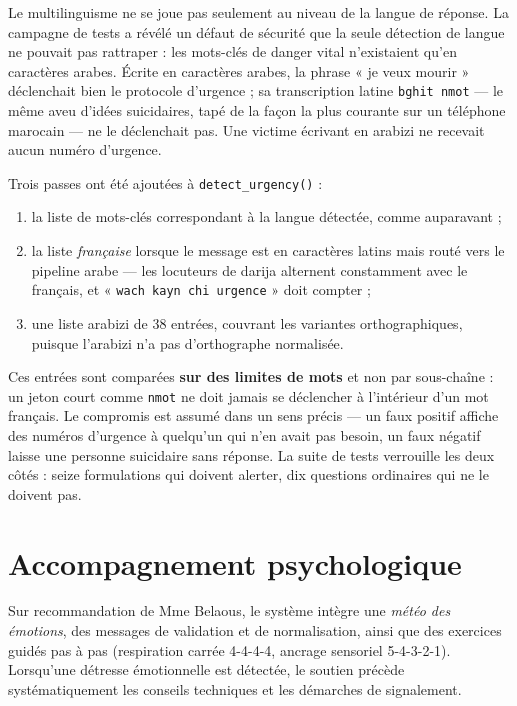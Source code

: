\documentclass[a4paper,11pt,twoside]{report}
\begin{document}
Le multilinguisme ne se joue pas seulement au niveau de la langue de réponse. La
campagne de tests a révélé un défaut de sécurité que la seule détection de langue
ne pouvait pas rattraper : les mots-clés de danger vital n'existaient qu'en
caractères arabes. Écrite en caractères arabes, la phrase « je veux mourir »
déclenchait bien le protocole d'urgence ; sa transcription latine
\texttt{bghit nmot} --- le même aveu
d'idées suicidaires, tapé de la façon la plus courante sur un téléphone marocain
--- ne le déclenchait pas. Une victime écrivant en arabizi ne recevait aucun
numéro d'urgence.

Trois passes ont été ajoutées à \texttt{detect\_urgency()} :

\begin{enumerate}[itemsep=2pt]
  \item la liste de mots-clés correspondant à la langue détectée, comme
  auparavant ;
  \item la liste \emph{française} lorsque le message est en caractères latins
  mais routé vers le pipeline arabe --- les locuteurs de darija alternent
  constamment avec le français, et « \texttt{wach kayn chi urgence} » doit
  compter ;
  \item une liste arabizi de 38 entrées, couvrant les variantes orthographiques,
  puisque l'arabizi n'a pas d'orthographe normalisée.
\end{enumerate}

Ces entrées sont comparées \textbf{sur des limites de mots} et non par
sous-chaîne : un jeton court comme \texttt{nmot} ne doit jamais se déclencher à
l'intérieur d'un mot français. Le compromis est assumé dans un sens précis --- un
faux positif affiche des numéros d'urgence à quelqu'un qui n'en avait pas besoin,
un faux négatif laisse une personne suicidaire sans réponse. La suite de tests
verrouille les deux côtés : seize formulations qui doivent alerter, dix questions
ordinaires qui ne le doivent pas.

\section{Accompagnement psychologique}

Sur recommandation de Mme Belaous, le système intègre une \emph{météo des
émotions}, des messages de validation et de normalisation, ainsi que des
exercices guidés pas à pas (respiration carrée 4-4-4-4, ancrage sensoriel
5-4-3-2-1). Lorsqu'une détresse émotionnelle est détectée, le soutien précède
systématiquement les conseils techniques et les démarches de signalement.
\end{document}
